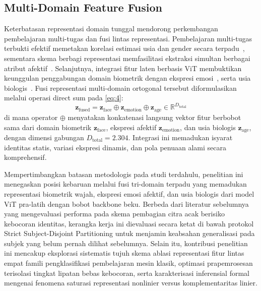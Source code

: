 \subsection{Multi-Domain Feature Fusion}
\label{sec:multidomain_feature_fusion}

Keterbatasan representasi domain tunggal mendorong perkembangan pembelajaran multi-tugas dan fusi lintas representasi. Pembelajaran multi-tugas terbukti efektif memetakan korelasi estimasi usia dan gender secara terpadu~\cite{ref12}, sementara skema berbagi representasi memfasilitasi ekstraksi simultan berbagai atribut afektif~\cite{ref16}. Selanjutnya, integrasi fitur laten berbasis ViT membuktikan keunggulan penggabungan domain biometrik dengan ekspresi emosi~\cite{ref19}, serta usia biologis~\cite{ref20}. Fusi representasi multi-domain ortogonal tersebut diformulasikan melalui operasi direct sum pada \eqref{eq:4}:
\begin{equation}
\mathbf{z}_{\text{fused}} = \mathbf{z}_{\text{face}} \oplus \mathbf{z}_{\text{emotion}} \oplus \mathbf{z}_{\text{age}} \in \mathbb{R}^{D_{\text{total}}}
\label{eq:4}
\end{equation}
di mana operator $\oplus$ menyatakan konkatenasi langsung vektor fitur berbobot sama dari domain biometrik $\mathbf{z}_{\text{face}}$, ekspresi afektif $\mathbf{z}_{\text{emotion}}$, dan usia biologis $\mathbf{z}_{\text{age}}$, dengan dimensi gabungan $D_{\text{total}} = 2.304$. Integrasi ini memadukan isyarat identitas statis, variasi ekspresi dinamis, dan pola penuaan alami secara komprehensif.

Mempertimbangkan batasan metodologis pada studi terdahulu, penelitian ini menegaskan posisi kebaruan melalui fusi tri-domain terpadu yang memadukan representasi biometrik wajah, ekspresi emosi afektif, dan usia biologis dari model ViT pra-latih dengan bobot backbone beku. Berbeda dari literatur sebelumnya yang mengevaluasi performa pada skema pembagian citra acak berisiko kebocoran identitas, kerangka kerja ini dievaluasi secara ketat di bawah protokol Strict Subject-Disjoint Partitioning untuk menjamin keabsahan generalisasi pada subjek yang belum pernah dilihat sebelumnya. Selain itu, kontribusi penelitian ini mencakup eksplorasi sistematis tujuh skema ablasi representasi fitur lintas empat famili pengklasifikasi pembelajaran mesin klasik, optimasi prapemrosesan terisolasi tingkat lipatan bebas kebocoran, serta karakterisasi inferensial formal mengenai fenomena saturasi representasi nonlinier versus komplementaritas linier.

